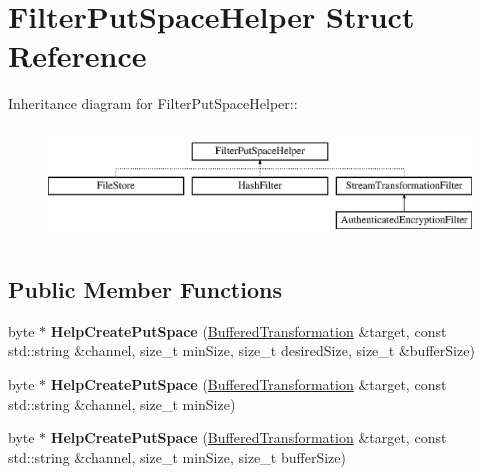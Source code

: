 \hypertarget{struct_filter_put_space_helper}{
\section{FilterPutSpaceHelper Struct Reference}
\label{struct_filter_put_space_helper}
}
Inheritance diagram for FilterPutSpaceHelper::\begin{figure}[H]
\begin{center}
\leavevmode
\includegraphics[height=2.99465cm]{struct_filter_put_space_helper}
\end{center}
\end{figure}
\subsection*{Public Member Functions}
\begin{DoxyCompactItemize}
\item 
\hypertarget{struct_filter_put_space_helper_a85fea9f0455741e4b340a3e035df9a39}{
byte $\ast$ {\bfseries HelpCreatePutSpace} (\hyperlink{class_buffered_transformation}{BufferedTransformation} \&target, const std::string \&channel, size\_\-t minSize, size\_\-t desiredSize, size\_\-t \&bufferSize)}
\label{struct_filter_put_space_helper_a85fea9f0455741e4b340a3e035df9a39}

\item 
\hypertarget{struct_filter_put_space_helper_a01f7232d4f27bc0c0a20115aa5090924}{
byte $\ast$ {\bfseries HelpCreatePutSpace} (\hyperlink{class_buffered_transformation}{BufferedTransformation} \&target, const std::string \&channel, size\_\-t minSize)}
\label{struct_filter_put_space_helper_a01f7232d4f27bc0c0a20115aa5090924}

\item 
\hypertarget{struct_filter_put_space_helper_aa6549687729073e4900e0867f59c0f4f}{
byte $\ast$ {\bfseries HelpCreatePutSpace} (\hyperlink{class_buffered_transformation}{BufferedTransformation} \&target, const std::string \&channel, size\_\-t minSize, size\_\-t bufferSize)}
\label{struct_filter_put_space_helper_aa6549687729073e4900e0867f59c0f4f}

\end{DoxyCompactItemize}
